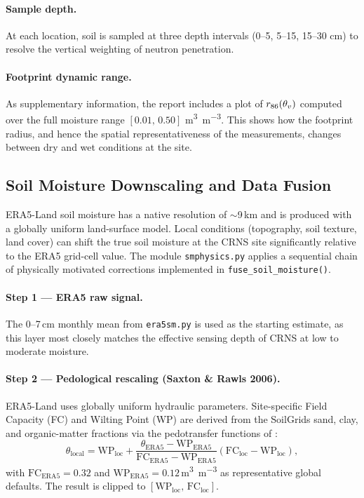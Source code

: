 \paragraph{Sample depth.}
At each location, soil is sampled at three depth intervals
(0–5, 5–15, 15–30 cm) to resolve the vertical weighting of
neutron penetration.

\paragraph{Footprint dynamic range.}
As supplementary information, the report includes a plot of
$r_{86}(\theta_v)$ computed over the full moisture range
$[0.01,\, 0.50]$ \si{\cubic\metre\per\cubic\metre}.
This shows how the footprint radius, and hence the spatial
representativeness of the measurements, changes between dry and
wet conditions at the site.

\subsection{Soil Moisture Downscaling and Data Fusion}
\label{sec:methods:smfusion}

ERA5-Land soil moisture has a native resolution of $\sim$9\,km and is
produced with a globally uniform land-surface model.
Local conditions (topography, soil texture, land cover) can shift
the true soil moisture at the CRNS site significantly relative to the
ERA5 grid-cell value.
The module \texttt{smphysics.py} applies a sequential chain of
physically motivated corrections implemented in \texttt{fuse\_soil\_moisture()}.

\paragraph{Step 1 — ERA5 raw signal.}
The 0--7\,cm monthly mean from \texttt{era5sm.py} is used as the
starting estimate, as this layer most closely matches the effective
sensing depth of CRNS at low to moderate moisture.

\paragraph{Step 2 — Pedological rescaling (Saxton \& Rawls 2006).}
ERA5-Land uses globally uniform hydraulic parameters.
Site-specific Field Capacity (FC) and Wilting Point (WP) are derived
from the SoilGrids sand, clay, and organic-matter fractions via the
pedotransfer functions of \citet{saxton2006}:
\begin{equation}
  \theta_\mathrm{local} = \mathrm{WP}_\mathrm{loc}
    + \frac{\theta_\mathrm{ERA5} - \mathrm{WP}_\mathrm{ERA5}}
           {\mathrm{FC}_\mathrm{ERA5} - \mathrm{WP}_\mathrm{ERA5}}
    \left(\mathrm{FC}_\mathrm{loc} - \mathrm{WP}_\mathrm{loc}\right),
  \label{eq:pedol_rescaling}
\end{equation}
with $\mathrm{FC}_\mathrm{ERA5} = 0.32$ and
$\mathrm{WP}_\mathrm{ERA5} = 0.12$\,\si{\cubic\metre\per\cubic\metre}
as representative global defaults.
The result is clipped to $[\mathrm{WP}_\mathrm{loc},\,\mathrm{FC}_\mathrm{loc}]$.

